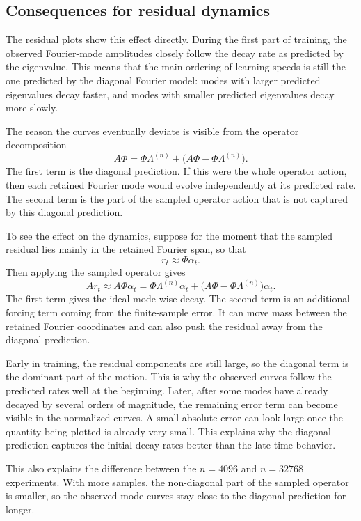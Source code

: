 \subsection{Consequences for residual dynamics}
\label{subsec:discussion-finite-data-dynamics}

The residual plots show this effect directly. During the first part of training,
the observed Fourier-mode amplitudes closely follow the decay rate as predicted by the
eigenvalue. This means that the main ordering of learning speeds is
still the one predicted by the diagonal Fourier model: modes with larger
predicted eigenvalues decay faster, and modes with smaller predicted eigenvalues
decay more slowly.

The reason the curves eventually deviate is visible from the operator
decomposition
\[
	A\Phi
	=
	\Phi\Lambda^{(n)}
	+
	\bigl(A\Phi-\Phi\Lambda^{(n)}\bigr).
\]
The first term is the diagonal prediction. If this were the whole operator
action, then each retained Fourier mode would evolve independently at its
predicted rate. The second term is the part of the sampled operator action that
is not captured by this diagonal prediction.

To see the effect on the dynamics, suppose for the moment that the sampled
residual lies mainly in the retained Fourier span, so that
\[
	r_t \approx \Phi \alpha_t .
\]
Then applying the sampled operator gives
\[
	A r_t
	\approx
	A\Phi\alpha_t
	=
	\Phi\Lambda^{(n)}\alpha_t
	+
	\bigl(A\Phi-\Phi\Lambda^{(n)}\bigr)\alpha_t .
\]
The first term gives the ideal mode-wise decay. The second term is an additional
forcing term coming from the finite-sample error. It can move mass between the
retained Fourier coordinates and can also push the residual away from the
diagonal prediction.

Early in training, the residual components are still large, so the diagonal
term is the dominant part of the motion. This is why the observed curves follow
the predicted rates well at the beginning. Later, after some modes have already
decayed by several orders of magnitude, the remaining error term can become
visible in the normalized curves. A small absolute error can look large once the
quantity being plotted is already very small. This explains why the diagonal
prediction captures the initial decay rates better than the late-time behavior.

This also explains the difference between the \(n=4096\) and \(n=32768\)
experiments. With more samples, the non-diagonal part of the sampled operator is
smaller, so the observed mode curves stay close to the diagonal prediction for
longer.

